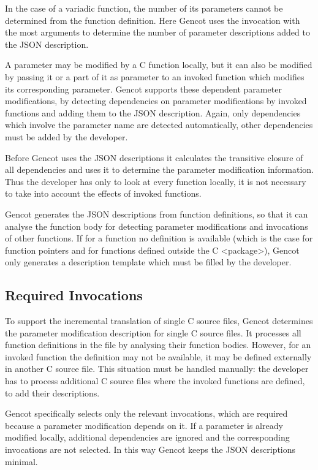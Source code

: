 In the case of a variadic function, the number of its parameters cannot be determined from the function definition.
Here Gencot uses the invocation with the most arguments to determine the number of parameter descriptions added
to the JSON description.

A parameter may be modified by a C function locally, but it can 
also be modified by passing it or a part of it as parameter to an invoked function which modifies its corresponding
parameter. Gencot supports these dependent parameter modifications, by detecting dependencies on parameter
modifications by invoked functions and adding them to the JSON description. Again, only dependencies which
involve the parameter name are detected automatically, other dependencies must be added by the developer.

Before Gencot uses the JSON descriptions it calculates the transitive closure of all dependencies and uses it to
determine the parameter modification information. Thus the developer has only to look at every function locally,
it is not necessary to take into account the effects of invoked functions.

Gencot generates the JSON descriptions from function definitions, so that it can analyse the function body for
detecting parameter modifications and invocations of other functions. If for a function no definition is available 
(which is the case for function pointers and for functions defined outside the C <package>), Gencot only generates 
a description template which must be filled by the developer.

\subsection{Required Invocations}
\label{design-parmod-required}

To support the incremental translation of single C source files, Gencot determines the parameter modification
description for single C source files. It processes all function definitions in the file by analysing their 
function bodies. However, for an invoked function the definition may not be available, it may be defined externally
in another C source file. This situation must be handled manually: the developer has to process additional
C source files where the invoked functions are defined, to add their descriptions.

Gencot specifically selects only the relevant invocations, which are required because a parameter modification depends on it.
If a parameter is already modified locally, additional dependencies are ignored and the corresponding invocations
are not selected. In this way Gencot keeps the JSON descriptions minimal.

